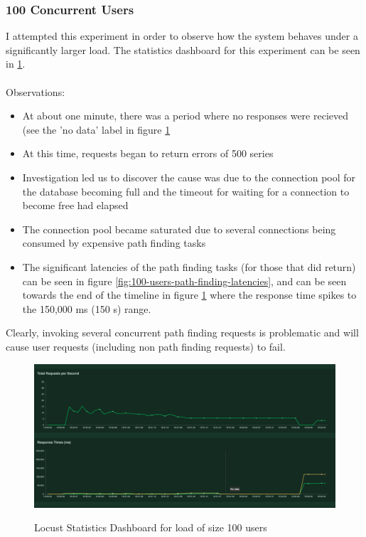 \subsubsection{100 Concurrent Users}
I attempted this experiment in order to observe how the system behaves under a significantly larger load. The statistics dashboard for this experiment can be seen in \ref{fig:100-users-stats-dashboard}. 
\\\\
Observations:
\begin{itemize}
    \item At about one minute, there was a period where no responses were recieved (see the 'no data' label in figure \ref{fig:100-users-stats-dashboard}
    \item At this time, requests began to return errors of 500 series
    \item Investigation led us to discover the cause was due to the connection pool for the database becoming full and the timeout for waiting for a connection to become free had elapsed
    \item The connection pool became saturated due to several connections being consumed by expensive path finding tasks
    \item The significant latencies of the path finding tasks (for those that did return) can be seen in figure \ref{fig:100-users-path-finding-latencies}, and can be seen towards the end of the timeline in figure \ref{fig:100-users-stats-dashboard} where the response time spikes to the 150,000 ms (150 s) range. 
    
\end{itemize}

Clearly, invoking several concurrent path finding requests is problematic and will cause user requests (including non path finding requests) to fail. 
\begin{figure}
  \centering
  \includegraphics[width = 22cm]{./figures/100-users-performance-trace}\\[0.5cm] 
  \caption{Locust Statistics Dashboard for load of size 100 users}
  \label{fig:100-users-stats-dashboard}
\end{figure}

